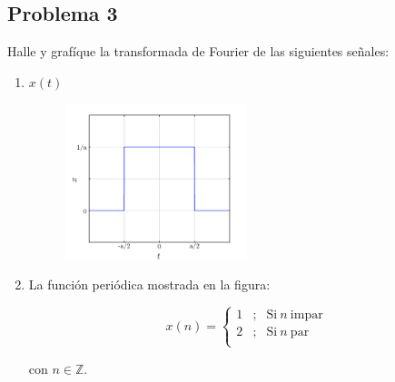 \documentclass[a4paper,12pt,final]{article}
\begin{document}
  \newpage
  \subsection*{Problema 3}

    \noindent Halle y grafíque la transformada de Fourier de las siguientes señales:
      \begin{enumerate}[label=\alph*)]
        \item $x\left(t\right)$

          \begin{figure}[H]
            \begin{center}
              \includegraphics[width=0.5\textwidth]{./laboratorio_4/problema03_a.png}
            \end{center}
          \end{figure}\vspace{-1.5em}

        \item La función periódica mostrada en la figura:

          \begin{equation*}
            x\left(n\right) = \left\{
              \begin{array}{ccl}
                1 & ; & \mathrm{Si}\ n\ \mathrm{impar}\\
                2 & ; & \mathrm{Si}\ n\ \mathrm{par}\\
              \end{array}
            \right.
          \end{equation*}

          con $n \in \mathbb{Z}$.


\end{enumerate}
\end{document}
